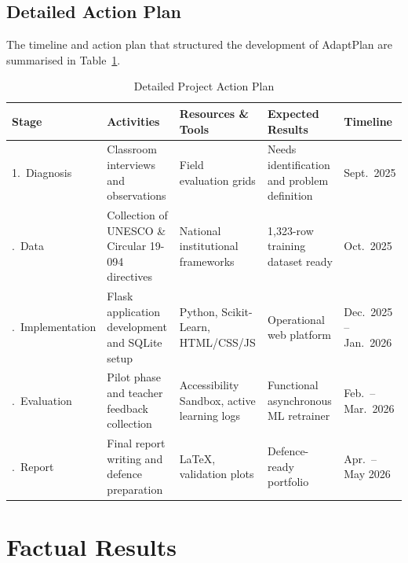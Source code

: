 \documentclass[12pt,a4paper]{report}
\begin{document}
\section{Detailed Action Plan}

The timeline and action plan that structured the development of AdaptPlan are summarised in Table~\ref{tab:action_plan}.

\begin{table}[H]
  \centering
  \small
  \caption{Detailed Project Action Plan}
  \label{tab:action_plan}
  \vspace{0.3cm}
  \begin{tabular}{p{2.0cm} p{2.8cm} p{2.8cm} p{3.0cm} p{2.2cm}}
    \toprule
    \textbf{Stage} & \textbf{Activities} & \textbf{Resources \& Tools} & \textbf{Expected Results} & \textbf{Timeline} \\
    \midrule
    1.\ Diagnosis      & Classroom interviews and observations                    & Field evaluation grids                              & Needs identification and problem definition       & Sept.\ 2025 \\
    \addlinespace
    2.\ Data           & Collection of UNESCO \& Circular 19-094 directives      & National institutional frameworks                   & 1,323-row training dataset ready                  & Oct.\ 2025  \\
    \addlinespace
    3.\ Implementation & Flask application development and SQLite setup           & Python, Scikit-Learn, HTML/CSS/JS                   & Operational web platform                          & Dec.\ 2025 -- Jan.\ 2026 \\
    \addlinespace
    4.\ Evaluation     & Pilot phase and teacher feedback collection              & Accessibility Sandbox, active learning logs         & Functional asynchronous ML retrainer              & Feb.\ -- Mar.\ 2026 \\
    \addlinespace
    5.\ Report         & Final report writing and defence preparation             & LaTeX, validation plots                             & Defence-ready portfolio                           & Apr.\ -- May 2026 \\
    \bottomrule
  \end{tabular}
\end{table}

\newpage

\chapter{Factual Results}
\end{document}
